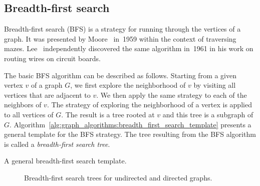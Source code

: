 
\subsection{Breadth-first search}

Breadth-first search (BFS) is a
strategy for running through the vertices of a graph. It was presented
by Moore~\cite{Moore1959} in~1959 within the
context of traversing mazes.
Lee~\cite{Lee1961} independently discovered the same
algorithm in~1961 in his work on routing wires on circuit
boards.

The basic BFS algorithm can be described as
follows. Starting from a given vertex $v$ of a graph $G$, we first
explore the neighborhood of $v$ by visiting all vertices that are
adjacent to $v$. We then apply the same strategy to each of the
neighbors of $v$. The strategy of exploring the neighborhood of a
vertex is applied to all vertices of $G$. The result is a
tree rooted at $v$ and this tree is a
subgraph of $G$.
Algorithm~\ref{alg:graph_algorithms:breadth_first_search_template}
presents a general template for the BFS strategy. The tree
resulting from the BFS algorithm is called a
\emph{breadth-first search tree}.

\begin{algorithm}[!htpb]

\caption{A general breadth-first search template.}
\label{alg:graph_algorithms:breadth_first_search_template}
\end{algorithm}

\begin{figure}[!htbp]
\centering
{}

\caption{Breadth-first search trees for undirected and directed graphs.}
\label{fig:graph_algorithms:breadth_first_search_undirected}
\end{figure}

